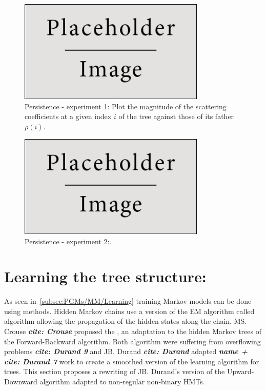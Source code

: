 \documentclass[a4paper,11pt]{report}
\begin{document}
{		\begin{figure}
				\begin{center}
					\includegraphics[width=3.5in]{placeholder.jpg}
					\caption[Persistence - experiment 1.]{Persistence - experiment 1: Plot the magnitude of the scattering coefficients at a given index $i$ of the tree against those of its father $\rho(i)$.} %
					\label{fig:Persistence - 1}
				\end{center}
		\end{figure} 
		
		\begin{figure}
				\begin{center}
					\includegraphics[width=3.5in]{placeholder.jpg}
					\caption[Persistence - experiment 2.]{Persistence - experiment 2:.} %
					\label{fig:Persistence - 2}
				\end{center}
		\end{figure}
		
		
  \section{Learning the tree structure:}
    \label{sec:SHMT/Learning}
    
    As seen in~\ref{subsec:PGMs/MM/Learning} training Markov  models can be done using  methods. Hidden Markov chains use a version of the EM algorithm called  algorithm allowing the propagation of the hidden states along the chain. MS. Crouse \textbf{\textit{cite: Crouse}} proposed the , an adaptation to the hidden Markov trees of the Forward-Backward algorithm. Both algorithm were suffering from overflowing problems \textbf{\textit{cite: Durand 9 }} and JB. Durand \textbf{\textit{cite: Durand}} adapted \textbf{\textit{name + cite: Durand 7}} work to create a smoothed version of the learning algorithm for trees. This section proposes a rewriting of JB. Durand's version of the Upward-Downward algorithm adapted to non-regular non-binary HMTs.\\
       
}
\end{document}
